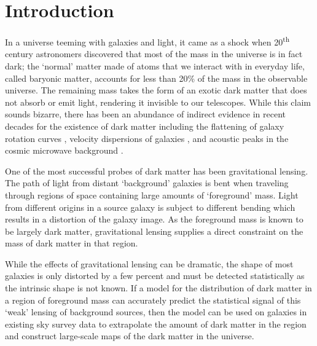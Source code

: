\documentclass[%
 reprint,
 amsmath,amssymb,
 aps,nofootinbib
]{revtex4-1}
\begin{document}
\maketitle



\section{Introduction}

In a universe teeming with galaxies and light, it came as a shock when 20\textsuperscript{th} century astronomers discovered that most of the mass in the universe is in fact dark; the `normal' matter made of atoms that we interact with in everyday life, called baryonic matter, accounts for less than 20\% of the mass in the observable universe. The remaining mass takes the form of an exotic dark matter that does not absorb or emit light, rendering it invisible to our telescopes. While this claim sounds bizarre, there has been an abundance of indirect evidence in recent decades for the existence of dark matter including the flattening of galaxy rotation curves \cite{rotation_curve}, velocity dispersions of galaxies \cite{zwicky}, and acoustic peaks in the cosmic microwave background \cite{planck_2015}.

One of the most successful probes of dark matter has been gravitational lensing. The path of light from distant `background' galaxies is bent when traveling through regions of space containing large amounts of `foreground' mass. Light from different origins in a source galaxy is subject to different bending which results in a distortion of the galaxy image. As the foreground mass is known to be largely dark matter, gravitational lensing supplies a direct constraint on the mass of dark matter in that region.

While the effects of gravitational lensing can be dramatic, the shape of most galaxies is only distorted by a few percent and must be detected statistically as the intrinsic shape is not known. If a model for the distribution of dark matter in a region of foreground mass can accurately predict the statistical signal of this `weak' lensing of background sources, then the model can be used on galaxies in existing sky survey data to extrapolate the amount of dark matter in the region and construct large-scale maps of the dark matter in the universe.\\
\end{document}
